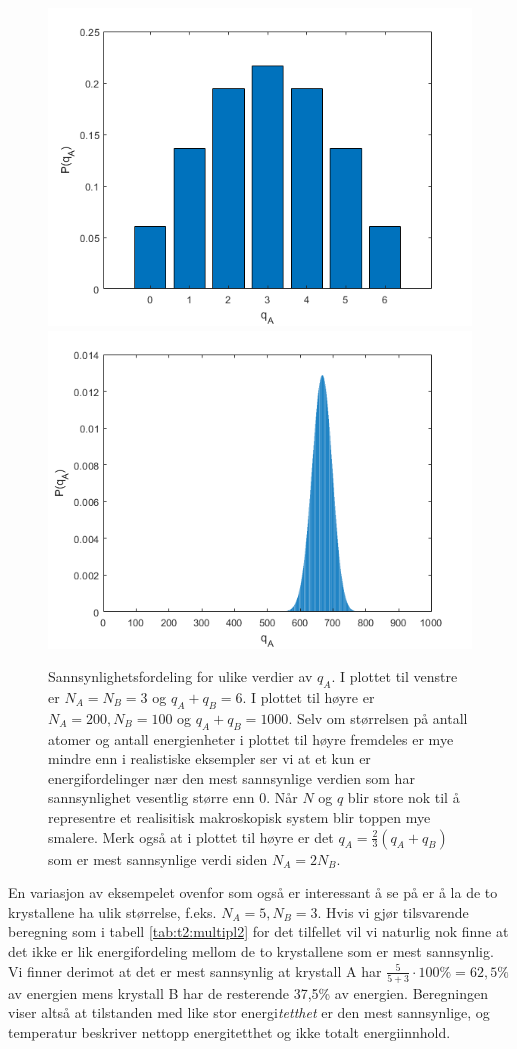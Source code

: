 \begin{figure}[tp]
\begin{center}
\includegraphics[width=.45\textwidth]{./multiplisitet_3_3_6}
\includegraphics[width=.45\textwidth]{./multiplisitet_200_100_1000}
\end{center}
\caption{Sannsynlighetsfordeling for ulike verdier av $q_A$. I plottet til venstre er $N_A = N_B = 3$ og $q_A + q_B = 6$. I plottet til høyre er $N_A = 200, N_B=100$ og $q_A + q_B = 1000$. Selv om størrelsen på antall atomer og antall energienheter i plottet til høyre fremdeles er mye mindre enn i realistiske eksempler ser vi at et kun er energifordelinger nær den mest sannsynlige verdien som har sannsynlighet vesentlig større enn 0. Når $N$ og $q$ blir store nok til å representre et realisitisk makroskopisk system blir toppen mye smalere. Merk også at i plottet til høyre er det $q_A = \frac{2}{3}(q_A+q_B)$ som er mest sannsynlige verdi siden $N_A = 2N_B$. }
\label{fig:t2:multiplisitet}
\end{figure}

En variasjon av eksempelet ovenfor som også er interessant å se på er å la de to krystallene ha ulik størrelse, f.eks. $N_A = 5, N_B = 3$. Hvis vi gjør tilsvarende beregning som i tabell \ref{tab:t2:multipl2} for det tilfellet vil vi naturlig nok finne at det ikke er lik energifordeling mellom de to krystallene som er mest sannsynlig. Vi finner derimot at det er mest sannsynlig at krystall A har $\frac{5}{5+3}\cdot100\% = 62,5\%$ av energien mens krystall B har de resterende 37,5\% av energien. Beregningen viser altså at tilstanden med like stor energi\emph{tetthet} er den mest sannsynlige, og temperatur beskriver nettopp energitetthet og ikke totalt energiinnhold. 

